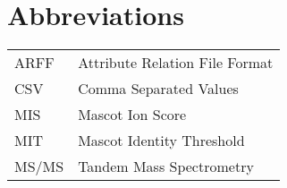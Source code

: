 \chapter{Abbreviations}
\begin{flushleft}
\renewcommand{\baselinestretch}{1.5}
\small\normalsize
\begin{longtable}{ll}
	ARFF & Attribute Relation File Format\\
	CSV & Comma Separated Values\\
	MIS & Mascot Ion Score\\
  MIT & Mascot Identity Threshold\\
    MS/MS & Tandem Mass Spectrometry\\
\end{longtable}
\end{flushleft}